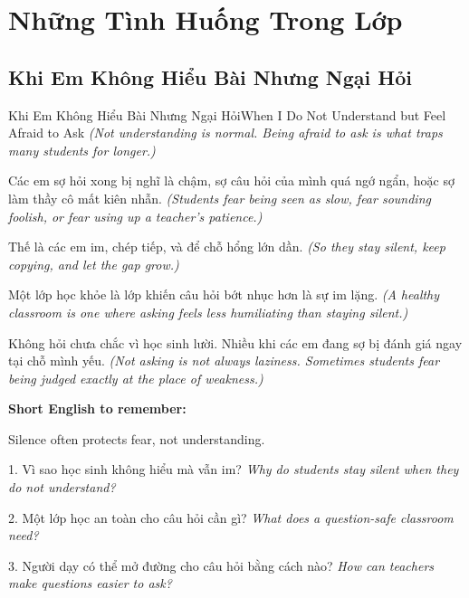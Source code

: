 \chapter{Những Tình Huống Trong Lớp}

\section{Khi Em Không Hiểu Bài Nhưng Ngại Hỏi}
\begin{truyen}{Khi Em Không Hiểu Bài Nhưng Ngại Hỏi}{When I Do Not Understand but Feel Afraid to Ask}
\textit{(Not understanding is normal. Being afraid to ask is what traps many students for longer.)}

Các em sợ hỏi xong bị nghĩ là chậm, sợ câu hỏi của mình quá ngớ ngẩn, hoặc sợ làm thầy cô mất kiên nhẫn.
\textit{(Students fear being seen as slow, fear sounding foolish, or fear using up a teacher's patience.)}

Thế là các em im, chép tiếp, và để chỗ hổng lớn dần.
\textit{(So they stay silent, keep copying, and let the gap grow.)}

Một lớp học khỏe là lớp khiến câu hỏi bớt nhục hơn là sự im lặng.
\textit{(A healthy classroom is one where asking feels less humiliating than staying silent.)}
\end{truyen}

\begin{baihoc}
Không hỏi chưa chắc vì học sinh lười. Nhiều khi các em đang sợ bị đánh giá ngay tại chỗ mình yếu.
\textit{(Not asking is not always laziness. Sometimes students fear being judged exactly at the place of weakness.)}
\end{baihoc}

\begin{ghinhoanh}
\textbf{Short English to remember:}

Silence often protects fear, not understanding.

\end{ghinhoanh}

\begin{tuhocnhanh}
1. Vì sao học sinh không hiểu mà vẫn im? \textit{Why do students stay silent when they do not understand?}

2. Một lớp học an toàn cho câu hỏi cần gì? \textit{What does a question-safe classroom need?}

3. Người dạy có thể mở đường cho câu hỏi bằng cách nào? \textit{How can teachers make questions easier to ask?}
\end{tuhocnhanh}
\ngancach

